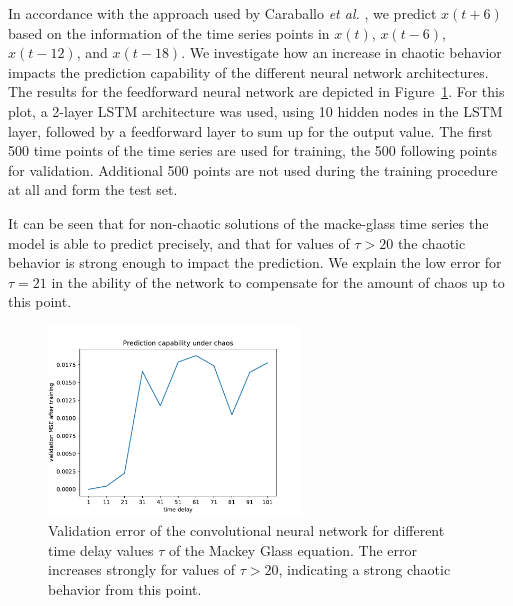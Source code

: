 \documentclass{article}
\begin{document}
In accordance with the approach used by Caraballo \textit{et al.}
\cite{caraballo2016}, we predict $x(t+6)$ based on the information of the time
series points in $x(t)$, $x(t-6)$, $x(t-12)$, and $x(t-18)$. We investigate how
an increase in chaotic behavior impacts the prediction capability of the
different neural network architectures. The results for the feedforward neural
network are depicted in Figure~\ref{fig:mackey_cnn}. For this plot, a 2-layer
LSTM architecture was used, using 10 hidden nodes in the LSTM layer,
followed by a feedforward layer to sum up for the output value.
The first 500 time points of the time series are used for training, the 500
following points for validation. Additional 500 points are not used during the
training procedure at all and form the test set.

It can be seen that for non-chaotic solutions of the macke-glass time series the
model is able to predict precisely, and that for values of $\tau > 20$ the
chaotic behavior is strong enough to impact the prediction. We explain the low
error for $\tau = 21$ in the ability of the network to compensate for the amount
of chaos up to this point.

\begin{figure}
  \centering
  \includegraphics[width=0.6\textwidth]{figures/mackey_glass_cnn.pdf}
  \caption{Validation error of the convolutional neural network for different
    time delay values $\tau$ of the Mackey Glass equation. The error increases
    strongly for values of $\tau > 20$, indicating a strong chaotic behavior
    from this point.}
  \label{fig:mackey_cnn}
\end{figure}
\end{document}
